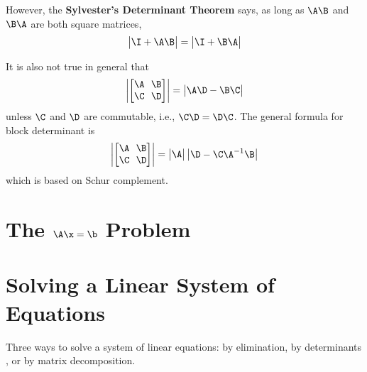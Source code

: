 However, the {\bf{Sylvester's Determinant Theorem}} says, as long as $\A\B$ and $\B\A$ are both square matrices,
\begin{align}
    \begin{vmatrix}\I+\A\B\end{vmatrix} = \begin{vmatrix}\I+\B\A\end{vmatrix}
\end{align}

It is also not true in general that
\begin{align*}
    \begin{vmatrix}\left[\begin{matrix}\A ~~ \B \\ \C ~~  \D\end{matrix}\right]\end{vmatrix} = \begin{vmatrix}\A\D-\B\C\end{vmatrix}
\end{align*}
unless $\C$ and $\D$ are commutable, i.e., $\C\D = \D\C$. The general formula for block determinant is
\begin{align}
    \begin{vmatrix}\left[\begin{matrix}\A ~~ \B \\ \C ~~  \D\end{matrix}\right]\end{vmatrix} = \begin{vmatrix}\A\end{vmatrix}\begin{vmatrix}\D - \C\A^{-1}\B\end{vmatrix}
\end{align}
which is based on Schur complement.


\section{The $\A\x=\b$ Problem}
\section{Solving a Linear System of Equations}
\begin{rmk}
	Three ways to solve a system of linear equations: by elimination, by determinants {\color{red}{(Cramer's Rule???)}}, or by matrix decomposition.
\end{rmk}

